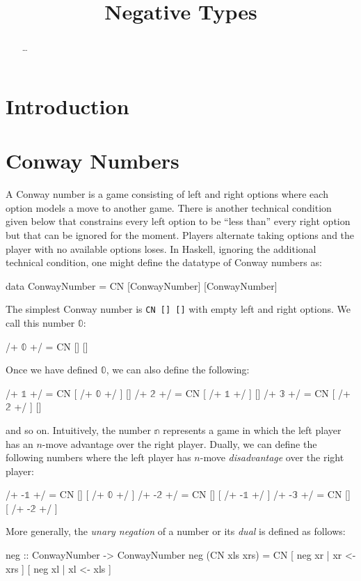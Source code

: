 \documentclass[authoryear,preprint]{sigplanconf}
\newcommand{\zerog}{\mathbb{0}}
\newcommand{\oneg}{\mathbb{1}}
\newcommand{\twog}{\mathbb{2}}
\newcommand{\threeg}{\mathbb{3}}
\begin{document}
\lstset{breaklines=true, breakatwhitespace=true}
\lstset{numbers=none, numbersep=5pt, stepnumber=2, numberstyle=\scriptsize}
\lstset{rangeprefix=/*!\ , rangesuffix=\ !*\/, includerangemarker=false}

\title{Negative Types}
\authorinfo{}{}{}
\maketitle

\begin{abstract}
\ldots
\end{abstract}

\section{Introduction}

\section{Conway Numbers}

A Conway number is a game consisting of left and right options where each
option models a move to another game. There is another technical condition
given below that constrains every left option to be ``less than'' every right
option but that can be ignored for the moment. Players alternate taking
options and the player with no available options loses. In Haskell, ignoring
the additional technical condition, one might define the datatype of Conway
numbers as:
\begin{code}
data ConwayNumber = CN [ConwayNumber] [ConwayNumber]
\end{code}
The simplest Conway number is \lstinline|CN [] []| with empty left and right
options. We call this number $\zerog$: 
\begin{code}
/+ $\zerog$ +/  = CN  [] []
\end{code}
Once we have defined $\zerog$, we can also define the following:
\begin{code}
/+ $\oneg$ +/  = CN  [ /+ $\zerog$ +/ ]  []
/+ $\twog$ +/  = CN  [ /+ $\oneg$ +/ ]  []
/+ $\threeg$ +/  = CN  [ /+ $\twog$ +/ ]  []
\end{code}
and so on. Intuitively, the number $\mathbb{n}$ represents a game in which
the left player has an $n$-move advantage over the right player. Dually, we
can define the following numbers where the left player has $n$-move
\emph{disadvantage} over the right player:
\begin{code}
/+ -$\oneg$ +/  = CN  [] [ /+ $\zerog$ +/ ]
/+ -$\twog$ +/  = CN  [] [ /+ -$\oneg$ +/ ]
/+ -$\threeg$ +/  = CN  [] [ /+ -$\twog$ +/ ]
\end{code}
More generally, the \emph{unary negation} of a number or its \emph{dual} is
defined as follows:
\begin{code}
neg :: ConwayNumber -> ConwayNumber
neg (CN xls xrs) = 
  CN [ neg xr | xr <- xrs ] [ neg xl | xl <- xls ]
\end{code}
\end{document}
